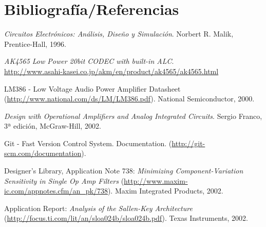 \section{Bibliografía/Referencias}

\renewcommand*{\refname}{}


\begin{thebibliography}{9}


	\emph{Circuitos Electrónicos: Análisis, Diseño y Simulación}.
	Norbert R. Malik,
	Prentice-Hall,
	1996.
 

	\emph{AK4565 Low Power 20bit CODEC with built-in ALC}.\\
	\url{http://www.asahi-kasei.co.jp/akm/en/product/ak4565/ak4565.html}


	LM386 - Low Voltage Audio Power Amplifier Datasheet
	(\url{http://www.national.com/ds/LM/LM386.pdf}).
	National Semiconductor,
	2000.

	\emph{Design with Operational Amplifiers and Analog Integrated Circuits}.
	Sergio Franco,
	3ª edición,
	McGraw-Hill,
	2002.

	Git - Fast Version Control System. Documentation.
	(\url{http://git-scm.com/documentation}).


	Designer's Library,
	Application Note 738:
	\emph{Minimizing Component-Variation Sensitivity in Single Op Amp Filters} (\url{http://www.maxim-ic.com/appnotes.cfm/an_pk/738}).
	Maxim Integrated Products,
	2002.

	Application Report:
	\emph{Analysis of the Sallen-Key Architecture} (\url{http://focus.ti.com/lit/an/sloa024b/sloa024b.pdf}).
	Texas Instruments,
	2002. 




\end{thebibliography}
